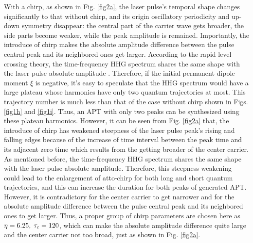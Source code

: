 \documentclass[10pt,letterpaper]{article}
\begin{document}
With a chirp, as shown in Fig. \ref{fig2a}, the laser pulse's temporal shape changes significantly to that without chirp, and its origin oscillatory periodicity and up-down symmetry disappear: the central part of the carrier wave gets broader, the side parts become weaker, while the peak amplitude is remained. Importantly, the introduce of chirp makes the absolute amplitude difference between the pulse central peak and its neighbored ones get larger. According to the rapid level crossing theory, the time-frequency HHG spectrum shares the same shape with the laser pulse absolute amplitude \cite{CuiNi2010NJP-wavelet}. Therefore, if the initial permanent dipole moment $\xi$ is negative, it's easy to speculate that the HHG spectrum would have a large plateau whose harmonics have only two quantum trajectories at most. This trajectory number is much less than that of the case without chirp shown in Figs. \ref{fig1h} and \ref{fig1i}. Thus, an APT with only two peaks can be synthesized using these plateau harmonics. However, it can be seen from Fig. \ref{fig2a} that, the introduce of chirp has weakened steepness of the laser pulse peak's rising and falling edges because of the increase of time interval between the peak time and its adjacent zero time which results from the getting broader of the center carrier. As mentioned before, the time-frequency HHG spectrum shares the same shape with the laser pulse absolute amplitude. Therefore, this steepness weakening could lead to the enlargement of atto-chirp \cite{attochirp-ref1-2003,attochirp-ref2-2007,attochirp-ref3-2009} for both long and short quantum trajectories, and this can increase the duration for both peaks of generated APT. However, it is contradictory for the center carrier to get narrower and for the absolute amplitude difference between the pulse central peak and its neighbored ones to get larger. Thus, a proper group of chirp parameters are chosen here as $\eta=6.25,\;\tau_{\rm{c}}=120$, which can make the absolute amplitude difference quite large and the center carrier not too broad, just as shown in Fig. \ref{fig2a}.
\end{document}
